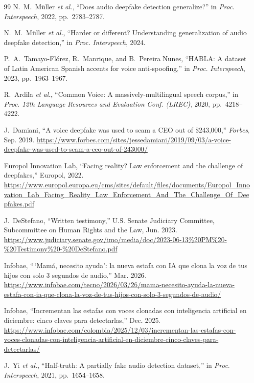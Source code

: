 \documentclass[11pt]{article}
\begin{document}
\begin{thebibliography}{99}
N.~M.~M\"uller \emph{et al.},
``Does audio deepfake detection generalize?''
in \emph{Proc. Interspeech}, 2022, pp.~2783--2787.

N.~M.~M\"uller \emph{et al.},
``Harder or different? Understanding generalization of audio deepfake
detection,'' in \emph{Proc. Interspeech}, 2024.

P.~A.~Tamayo-Fl\'orez, R.~Manrique, and B.~Pereira Nunes,
``HABLA: A dataset of Latin American Spanish accents for voice
anti-spoofing,'' in \emph{Proc. Interspeech}, 2023, pp.~1963--1967.

R.~Ardila \emph{et al.},
``Common Voice: A massively-multilingual speech corpus,''
in \emph{Proc. 12th Language Resources and Evaluation Conf. (LREC)},
2020, pp.~4218--4222.

J.~Damiani,
``A voice deepfake was used to scam a CEO out of \$243,000,''
\emph{Forbes}, Sep. 2019.
\url{https://www.forbes.com/sites/jessedamiani/2019/09/03/a-voice-deepfake-was-used-to-scam-a-ceo-out-of-243000/}

Europol Innovation Lab,
``Facing reality? Law enforcement and the challenge of deepfakes,''
Europol, 2022.
\url{https://www.europol.europa.eu/cms/sites/default/files/documents/Europol_Innovation_Lab_Facing_Reality_Law_Enforcement_And_The_Challenge_Of_Deepfakes.pdf}

J.~DeStefano,
``Written testimony,''
U.S. Senate Judiciary Committee, Subcommittee on Human Rights and the
Law, Jun. 2023.
\url{https://www.judiciary.senate.gov/imo/media/doc/2023-06-13\%20PM\%20-\%20Testimony\%20-\%20DeStefano.pdf}

Infobae,
``\,`Mam\'a, necesito ayuda': la nueva estafa con IA que clona la voz de
tus hijos con solo 3 segundos de audio,''
Mar. 2026.
\url{https://www.infobae.com/tecno/2026/03/26/mama-necesito-ayuda-la-nueva-estafa-con-ia-que-clona-la-voz-de-tus-hijos-con-solo-3-segundos-de-audio/}

Infobae,
``Incrementan las estafas con voces clonadas con inteligencia
artificial en diciembre: cinco claves para detectarlas,''
Dec. 2025.
\url{https://www.infobae.com/colombia/2025/12/03/incrementan-las-estafas-con-voces-clonadas-con-inteligencia-artificial-en-diciembre-cinco-claves-para-detectarlas/}

J.~Yi \emph{et al.},
``Half-truth: A partially fake audio detection dataset,''
in \emph{Proc. Interspeech}, 2021, pp.~1654--1658.


\end{thebibliography}
\end{document}
